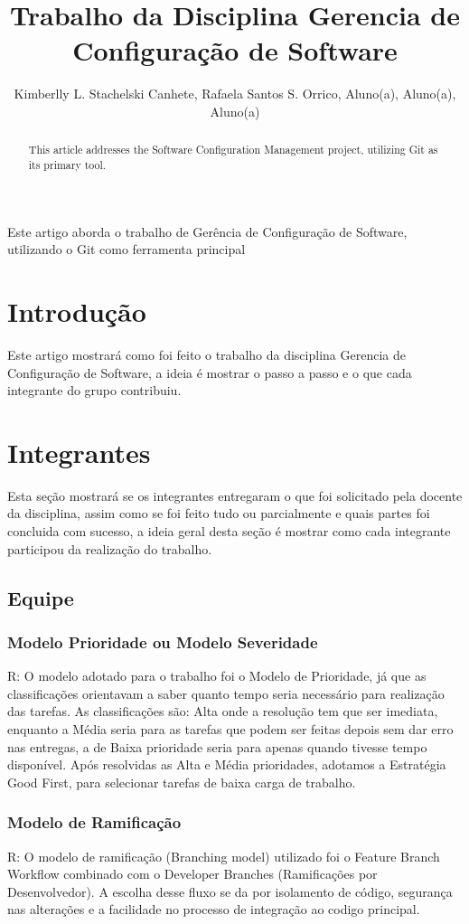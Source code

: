 \documentclass[12pt]{article}
\title{Trabalho da Disciplina Gerencia de Configuração de Software}
\author{Kimberlly L. Stachelski Canhete\inst{1}, Rafaela Santos S. Orrico\inst{2}, Aluno(a)\inst{3}, Aluno(a)\inst{4}, Aluno(a)\inst{5}}
\begin{document}
\maketitle
\begin{abstract}
    This article addresses the Software Configuration Management project, utilizing Git as its primary tool.
\end{abstract}

\begin{resumo}
  Este artigo aborda o trabalho de Gerência de Configuração de Software, utilizando o Git como ferramenta principal
\end{resumo}

\section{Introdução}
Este artigo mostrará como foi feito o trabalho da disciplina Gerencia de Configuração de Software, a ideia é mostrar o passo a passo e o que cada integrante do grupo contribuiu.

\section{Integrantes}
Esta seção mostrará se os integrantes entregaram o que foi solicitado pela docente da disciplina, assim como se foi feito tudo ou parcialmente e quais partes foi concluida com sucesso, a ideia geral desta seção é mostrar como cada integrante participou da realização do trabalho.

\subsection{Equipe}
    \subsubsection{Modelo Prioridade ou Modelo Severidade}
    R: O modelo adotado para o trabalho foi o Modelo de Prioridade, já que as classificações orientavam a saber quanto tempo seria necessário para realização das tarefas. As classificações são: Alta onde a resolução tem que ser imediata, enquanto a Média seria para as tarefas que podem ser feitas depois sem dar erro nas entregas, a de Baixa prioridade seria para apenas quando tivesse tempo disponível. Após resolvidas as Alta e Média prioridades, adotamos a Estratégia Good First, para selecionar tarefas de baixa carga de trabalho.

    \subsubsection{Modelo de Ramificação}
     R: O modelo de ramificação (Branching model) utilizado foi o Feature Branch Workflow combinado com o Developer Branches (Ramificações por Desenvolvedor).
     A escolha desse fluxo se da por isolamento de código, segurança nas alterações e a facilidade no processo de integração ao codigo principal.
     
\end{document}
